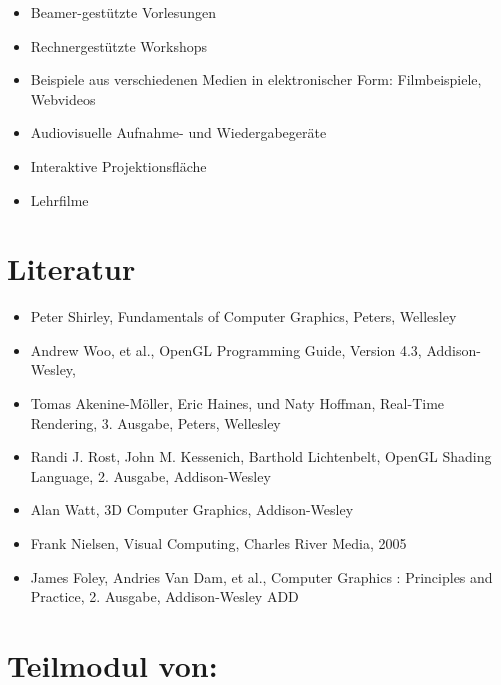 \begin{itemize}
\tightlist
\item
  Beamer-gestützte Vorlesungen
\item
  Rechnergestützte Workshops
\item
  Beispiele aus verschiedenen Medien in elektronischer Form:
  Filmbeispiele, Webvideos
\item
  Audiovisuelle Aufnahme- und Wiedergabegeräte
\item
  Interaktive Projektionsfläche
\item
  Lehrfilme
\end{itemize}

\hypertarget{literaturpathlabelmi-2017modulbeschreibungen-bachelorba_vc-computergrafik-und-animation}{%
\section*{Literatur\label{/mi-2017/modulbeschreibungen-bachelor/BA_VC-computergrafik-und-animation}}\label{literaturpathlabelmi-2017modulbeschreibungen-bachelorba_vc-computergrafik-und-animation}}

\begin{itemize}
\tightlist
\item
  Peter Shirley, Fundamentals of Computer Graphics, Peters, Wellesley
\item
  Andrew Woo, et al., OpenGL Programming Guide, Version 4.3,
  Addison-Wesley,
\item
  Tomas Akenine-Möller, Eric Haines, und Naty Hoffman, Real-Time
  Rendering, 3. Ausgabe, Peters, Wellesley
\item
  Randi J. Rost, John M. Kessenich, Barthold Lichtenbelt, OpenGL Shading
  Language, 2. Ausgabe, Addison-Wesley
\item
  Alan Watt, 3D Computer Graphics, Addison-Wesley
\item
  Frank Nielsen, Visual Computing, Charles River Media, 2005
\item
  James Foley, Andries Van Dam, et al., Computer Graphics : Principles
  and Practice, 2. Ausgabe, Addison-Wesley ADD
\end{itemize}

\hypertarget{teilmodul-vonpathlabelmi-2017modulbeschreibungen-bachelorba_vc-computergrafik-und-animation}{%
\section*{Teilmodul
von:\label{/mi-2017/modulbeschreibungen-bachelor/BA_VC-computergrafik-und-animation}}\label{teilmodul-vonpathlabelmi-2017modulbeschreibungen-bachelorba_vc-computergrafik-und-animation}}


